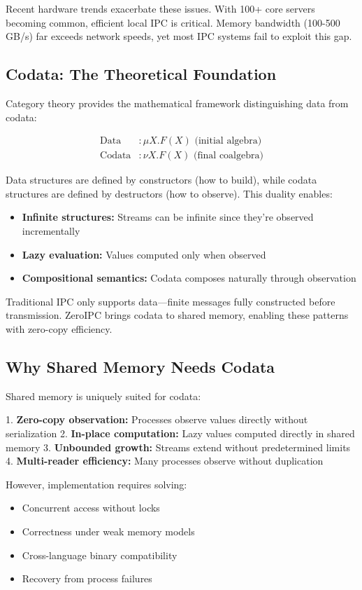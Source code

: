 \documentclass[sigconf,anonymous]{acmart}
\begin{document}
Recent hardware trends exacerbate these issues. With 100+ core servers becoming common, efficient local IPC is critical. Memory bandwidth (100-500 GB/s) far exceeds network speeds, yet most IPC systems fail to exploit this gap.

\subsection{Codata: The Theoretical Foundation}

Category theory provides the mathematical framework distinguishing data from codata:

\begin{align}
\text{Data} &: \mu X. F(X) \text{ (initial algebra)} \\
\text{Codata} &: \nu X. F(X) \text{ (final coalgebra)}
\end{align}

Data structures are defined by constructors (how to build), while codata structures are defined by destructors (how to observe). This duality enables:

\begin{itemize}
\item \textbf{Infinite structures:} Streams can be infinite since they're observed incrementally
\item \textbf{Lazy evaluation:} Values computed only when observed
\item \textbf{Compositional semantics:} Codata composes naturally through observation
\end{itemize}

Traditional IPC only supports data---finite messages fully constructed before transmission. ZeroIPC brings codata to shared memory, enabling these patterns with zero-copy efficiency.

\subsection{Why Shared Memory Needs Codata}

Shared memory is uniquely suited for codata:

1. \textbf{Zero-copy observation:} Processes observe values directly without serialization
2. \textbf{In-place computation:} Lazy values computed directly in shared memory  
3. \textbf{Unbounded growth:} Streams extend without predetermined limits
4. \textbf{Multi-reader efficiency:} Many processes observe without duplication

However, implementation requires solving:
\begin{itemize}
\item Concurrent access without locks
\item Correctness under weak memory models
\item Cross-language binary compatibility
\item Recovery from process failures
\end{itemize}
\end{document}
